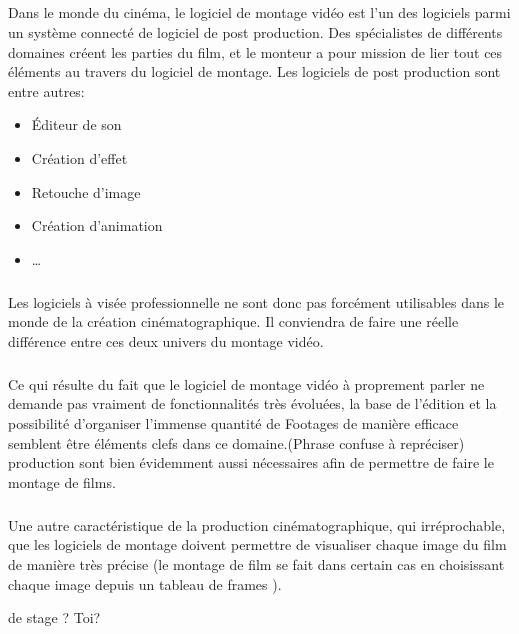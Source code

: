 \subparagraph{}

Dans le monde du cinéma, le logiciel de montage vidéo est l'un des
logiciels parmi un système connecté de logiciel de post production. Des
spécialistes de différents domaines créent les parties du film,
et le monteur a pour mission de lier tout ces éléments au travers du
logiciel de montage. Les logiciels de post production sont entre autres:

\begin{itemize} \setlength{\itemsep}{2mm}

  \item{Éditeur de son}

  \item{Création d'effet}

  \item{Retouche d'image}

  \item{Création d'animation}

  \item{\ldots}

\end{itemize}

\subparagraph{}

Les logiciels à visée professionnelle ne sont donc pas forcément
utilisables dans le monde de la création cinématographique. Il
conviendra de faire une réelle différence entre ces deux univers du
montage vidéo.

\subparagraph{}

Ce qui résulte du fait que le logiciel de montage vidéo à proprement
parler ne demande pas vraiment de fonctionnalités très évoluées, la
base de l'édition et la possibilité d'organiser l'immense quantité
de Footages de manière efficace semblent être éléments clefs dans
ce domaine.(Phrase confuse à repréciser)%
production sont bien évidemment aussi nécessaires afin de permettre de
faire le montage de films.%

\subparagraph{}

Une autre caractéristique de la production cinématographique, qui
irréprochable, %
que les logiciels de montage doivent permettre de
visualiser chaque image du film de manière très précise (le montage
de film se fait dans certain cas en choisissant chaque image depuis un
tableau de frames ).

de stage ? Toi?

